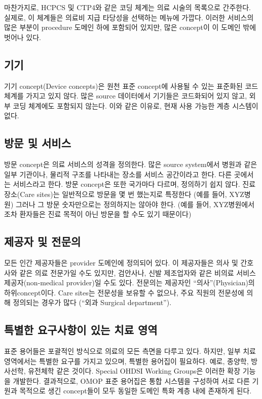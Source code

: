 \documentclass[11pt]{book}
\theoremstyle{definition}
\theoremstyle{definition}
\theoremstyle{definition}
\theoremstyle{remark}
\begin{document}
마찬가지로, HCPCS 및 CTP4와 같은 코딩 체계는 의료 시술의 목록으로
간주한다. 실제로, 이 체계들은 의료비 지급 타당성을 선택하는 메뉴에
가깝다. 이러한 서비스의 많은 부분이 procedure 도메인 하에 포함되어
있지만, 많은 concept이 이 도메인 밖에 벗어나 있다.

\subsection{기기}

기기 concept(Device concepts)은 원천 표준 concept에 사용될 수 있는
표준화된 코드 체계를 가지고 있지 않다. 많은 source 데이터에서 기기들은
코드화되어 있지 않고, 외부 코딩 체계에도 포함되지 않는다. 이와 같은
이유로, 현재 사용 가능한 계층 시스템이 없다.

\subsection{방문 및 서비스}\label{--}

방문 concept은 의료 서비스의 성격을 정의한다. 많은 source system에서
병원과 같은 일부 기관이나, 물리적 구조를 나타내는 장소를 서비스
공간이라고 한다. 다른 곳에서는 서비스라고 한다. 방문 concept은 또한
국가마다 다르며, 정의하기 쉽지 않다. 진료 장소(Care sites)는 일반적으로
방문을 몇 번 했는지로 특정한다 (예를 들어, XYZ병원) 그러나 그 방문
숫자만으로는 정의하지는 않아야 한다. (예를 들어, XYZ병원에서 조차
환자들은 진료 목적이 아닌 방문을 할 수도 있기 때문이다)

\subsection{제공자 및 전문의}\label{--}

모든 인간 제공자들은 provider 도메인에 정의되어 있다. 이 제공자들은 의사
및 간호사와 같은 의료 전문가일 수도 있지만, 검안사나, 신발 제조업자와
같은 비의료 서비스 제공자(non-medical provider)일 수도 있다. 전문의는
제공자인 ``의사''(Physician)의 하위concept이다. Care sites는 전문성을
보유할 수 없으나, 주요 직원의 전문성에 의해 정의되는 경우가 많다 (``외과
Surgical department'').

\subsection{특별한 요구사항이 있는 치료 영역}\label{----}

표준 용어들은 포괄적인 방식으로 의료의 모든 측면을 다루고 있다. 하지만,
일부 치료영역에서는 특별한 요구를 가지고 있으며, 특별한 용어집이
필요하다. 예로, 종양학, 방사선학, 유전체학 같은 것이다. Special OHDSI
Working Groups은 이러한 확장 기능을 개발한다. 결과적으로, OMOP 표준
용어집은 통합 시스템을 구성하여 서로 다른 기원과 목적으로 생긴
concept들이 모두 동일한 도메인 특화 계층 내에 존재하게 된다.
\end{document}
